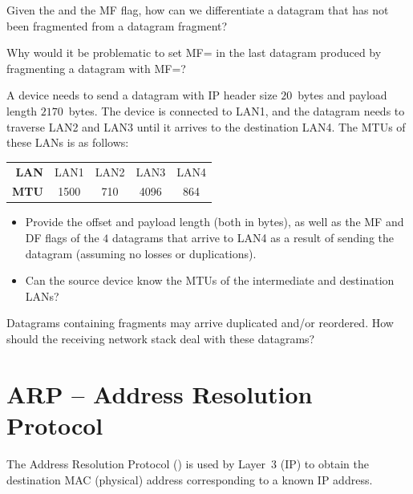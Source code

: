 \begin{exercise}
Given the  and the MF flag, how can we differentiate
a datagram that has not been fragmented from a datagram fragment?
\end{exercise}

\begin{exercise}
Why would it be problematic to set MF= in the last datagram 
produced by fragmenting a datagram with MF=?
\end{exercise}

\begin{exercise}
A device needs to send a datagram with IP header size $20$~bytes and payload length $2170$~bytes.
The device is connected to LAN1, and the datagram needs to traverse 
LAN2 and LAN3 until it arrives to the destination LAN4. The MTUs of these LANs is as follows:
\begin{center}
\begin{tabular}{r cccc}
\toprule
\textbf{LAN} & LAN1 & LAN2 & LAN3 & LAN4 \\
\textbf{MTU} & 1500 & 710  & 4096 & 864  \\
\bottomrule
\end{tabular}
\end{center}

\begin{itemize}
\item Provide the offset and payload length (both in bytes),
 as well as the MF and DF flags of the $4$ datagrams
 that arrive to LAN4 as a result of sending the datagram
 (assuming no losses or duplications).
  
\item Can the source device know the MTUs of the intermediate and destination 
LANs?
\end{itemize}

\end{exercise}


\begin{exercise}
Datagrams containing fragments may arrive duplicated and/or reordered. 
How should the receiving network stack deal with these datagrams?
\end{exercise}


\section{ARP -- Address Resolution Protocol}\label{sec:layer3:arp}

The Address Resolution Protocol () is used by Layer~3 (IP)
to obtain the destination MAC (physical) address corresponding to a known IP address.

